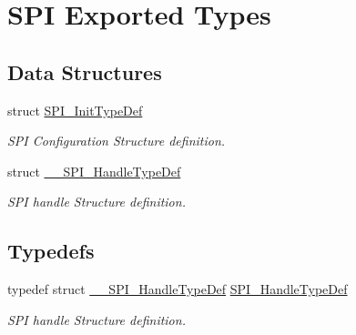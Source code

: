 \hypertarget{group___s_p_i___exported___types}{}\section{S\+PI Exported Types}
\label{group___s_p_i___exported___types}
\subsection*{Data Structures}
\begin{DoxyCompactItemize}
\item 
struct \hyperlink{struct_s_p_i___init_type_def}{S\+P\+I\+\_\+\+Init\+Type\+Def}
\begin{DoxyCompactList}\small\item\em S\+PI Configuration Structure definition. \end{DoxyCompactList}\item 
struct \hyperlink{struct_____s_p_i___handle_type_def}{\+\_\+\+\_\+\+S\+P\+I\+\_\+\+Handle\+Type\+Def}
\begin{DoxyCompactList}\small\item\em S\+PI handle Structure definition. \end{DoxyCompactList}\end{DoxyCompactItemize}
\subsection*{Typedefs}
\begin{DoxyCompactItemize}
\item 
\mbox{\label{group___s_p_i___exported___types_gab3bd115785297692c125528b7293566b}} 
typedef struct \hyperlink{struct_____s_p_i___handle_type_def}{\+\_\+\+\_\+\+S\+P\+I\+\_\+\+Handle\+Type\+Def} \hyperlink{group___s_p_i___exported___types_gab3bd115785297692c125528b7293566b}{S\+P\+I\+\_\+\+Handle\+Type\+Def}
\begin{DoxyCompactList}\small\item\em S\+PI handle Structure definition. \end{DoxyCompactList}\end{DoxyCompactItemize}
